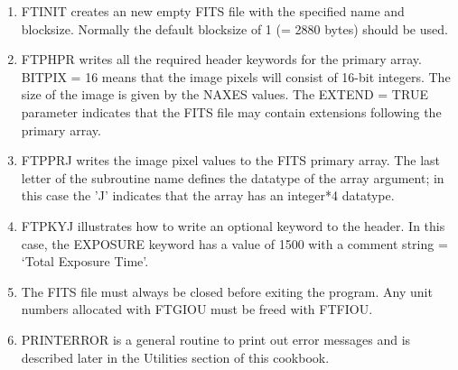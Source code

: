 \begin{enumerate}
\item
FTINIT creates an new empty FITS file with the specified name
and blocksize.  Normally the default blocksize of 1 (= 2880 bytes)
should be used.

\item
FTPHPR writes all the required header keywords for the primary array.
BITPIX = 16 means that the image pixels will consist of 16-bit
integers.  The size of the image is given by the NAXES values. 
The EXTEND = TRUE parameter indicates that the FITS file
may contain extensions following the primary array.

\item
FTPPRJ writes the image pixel values to the FITS primary array.  The
last letter of the subroutine name defines the datatype of the array
argument; in this case the 'J' indicates that the array has an
integer*4 datatype.
\item
FTPKYJ illustrates how to write an optional keyword to the header.
In this case, the EXPOSURE keyword has a value of 1500 with a 
comment string = `Total Exposure Time'.
\item
The FITS file must always be closed before exiting the program. 
Any unit numbers allocated with FTGIOU must be freed with FTFIOU.
\item
PRINTERROR is a general routine to print out error messages and is
described later in the Utilities section of this cookbook.
\end{enumerate}

